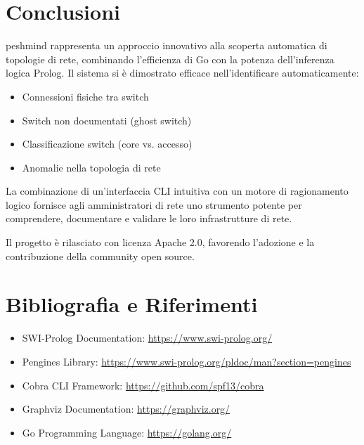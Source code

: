 \documentclass[12pt,a4paper]{article}
\begin{document}
\section{Conclusioni}

peshmind rappresenta un approccio innovativo alla scoperta automatica di topologie di rete, combinando l'efficienza di Go con la potenza dell'inferenza logica Prolog. Il sistema si è dimostrato efficace nell'identificare automaticamente:

\begin{itemize}
    \item Connessioni fisiche tra switch
    \item Switch non documentati (ghost switch)
    \item Classificazione switch (core vs. accesso)
    \item Anomalie nella topologia di rete
\end{itemize}

La combinazione di un'interfaccia CLI intuitiva con un motore di ragionamento logico fornisce agli amministratori di rete uno strumento potente per comprendere, documentare e validare le loro infrastrutture di rete.

Il progetto è rilasciato con licenza Apache 2.0, favorendo l'adozione e la contribuzione della community open source.

\section{Bibliografia e Riferimenti}

\begin{itemize}
    \item SWI-Prolog Documentation: \url{https://www.swi-prolog.org/}
    \item Pengines Library: \url{https://www.swi-prolog.org/pldoc/man?section=pengines}
    \item Cobra CLI Framework: \url{https://github.com/spf13/cobra}
    \item Graphviz Documentation: \url{https://graphviz.org/}
    \item Go Programming Language: \url{https://golang.org/}
\end{itemize}

\appendix
\end{document}
